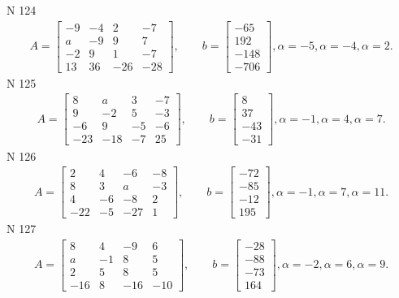 \documentclass[11pt]{report}
\begin{document}
N 124
\begin{align*}
 A = \left[\begin{matrix}-9 & -4 & 2 & -7\\a & -9 & 9 & 7\\-2 & 9 & 1 & -7\\13 & 36 & -26 & -28\end{matrix}\right],
    \qquad b = \left[\begin{matrix}-65\\192\\-148\\-706\end{matrix}\right], \alpha = -5, \alpha = -4, \alpha = 2. 
 \end{align*}
N 125
\begin{align*}
 A = \left[\begin{matrix}8 & a & 3 & -7\\9 & -2 & 5 & -3\\-6 & 9 & -5 & -6\\-23 & -18 & -7 & 25\end{matrix}\right],
    \qquad b = \left[\begin{matrix}8\\37\\-43\\-31\end{matrix}\right], \alpha = -1, \alpha = 4, \alpha = 7. 
 \end{align*}
N 126
\begin{align*}
 A = \left[\begin{matrix}2 & 4 & -6 & -8\\8 & 3 & a & -3\\4 & -6 & -8 & 2\\-22 & -5 & -27 & 1\end{matrix}\right],
    \qquad b = \left[\begin{matrix}-72\\-85\\-12\\195\end{matrix}\right], \alpha = -1, \alpha = 7, \alpha = 11. 
 \end{align*}
N 127
\begin{align*}
 A = \left[\begin{matrix}8 & 4 & -9 & 6\\a & -1 & 8 & 5\\2 & 5 & 8 & 5\\-16 & 8 & -16 & -10\end{matrix}\right],
    \qquad b = \left[\begin{matrix}-28\\-88\\-73\\164\end{matrix}\right], \alpha = -2, \alpha = 6, \alpha = 9. 
 \end{align*}
\end{document}

